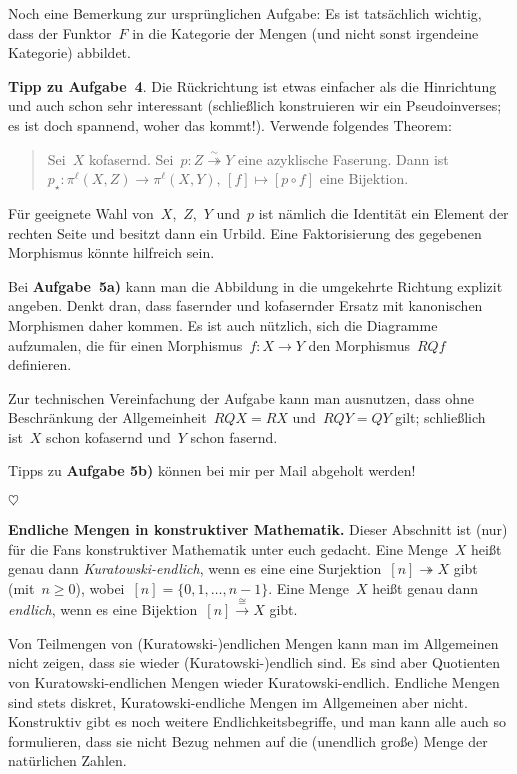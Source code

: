 \documentclass{uebblatt}
\newcommand{\stopper}{\begin{center}$\heartsuit$\end{center}}
\begin{document}
Noch eine Bemerkung zur ursprünglichen Aufgabe: Es ist tatsächlich wichtig,
dass der Funktor~$F$ in die Kategorie der Mengen (und nicht sonst irgendeine
Kategorie) abbildet.

\textbf{Tipp zu Aufgabe~4}. Die Rückrichtung ist etwas einfacher als die
Hinrichtung und auch schon sehr interessant (schließlich konstruieren wir ein
Pseudoinverses; es ist doch spannend, woher das kommt!). Verwende folgendes
Theorem:
\begin{quote}Sei~$X$ kofasernd. Sei~$p : Z \stackrel{\sim}{\twoheadrightarrow} Y$
eine azyklische Faserung. Dann ist~$p_\star : \pi^\ell(X,Z) \to
\pi^\ell(X,Y),\,[f] \mapsto [p \circ f]$ eine Bijektion.
\end{quote}
Für geeignete Wahl von~$X$,~$Z$,~$Y$ und~$p$ ist nämlich die Identität ein
Element der rechten Seite und besitzt dann ein Urbild. Eine Faktorisierung des
gegebenen Morphismus könnte hilfreich sein.

Bei \textbf{Aufgabe~5a)} kann man die Abbildung in die umgekehrte Richtung
explizit angeben. Denkt dran, dass fasernder und kofasernder Ersatz mit
kanonischen Morphismen daher kommen. Es ist auch nützlich, sich die Diagramme
aufzumalen, die für einen Morphismus~$f : X \to Y$ den Morphismus~$RQf$
definieren.

Zur technischen Vereinfachung der Aufgabe kann man ausnutzen, dass ohne
Beschränkung der Allgemeinheit~$RQX = RX$ und~$RQY = QY$ gilt; schließlich ist~$X$
schon kofasernd und~$Y$ schon fasernd.

Tipps zu \textbf{Aufgabe 5b)} können bei mir per Mail abgeholt werden!

\stopper

\textbf{Endliche Mengen in konstruktiver Mathematik.} Dieser Abschnitt ist
(nur) für die Fans konstruktiver Mathematik unter euch gedacht.
Eine Menge~$X$ heißt genau dann \emph{Kuratowski-endlich}, wenn es eine
eine Surjektion~$[n] \twoheadrightarrow X$ gibt (mit~$n \geq 0$), wobei~$[n] =
\{0,1,\ldots,n-1\}$. Eine Menge~$X$ heißt genau dann \emph{endlich}, wenn es
eine Bijektion~$[n] \stackrel{\cong}{\to} X$ gibt.

Von Teilmengen von (Kuratowski-)endlichen Mengen kann man im Allgemeinen nicht
zeigen, dass sie wieder (Kuratowski-)endlich sind. Es sind aber Quotienten von
Kuratowski-endlichen Mengen wieder Kuratowski-endlich. Endliche Mengen sind
stets diskret, Kura\-towski-endliche Mengen im Allgemeinen aber nicht.
Konstruktiv gibt es noch weitere Endlichkeitsbegriffe, und man kann alle auch
so formulieren, dass sie nicht Bezug nehmen auf die (unendlich große) Menge der
natürlichen Zahlen.
\end{document}
